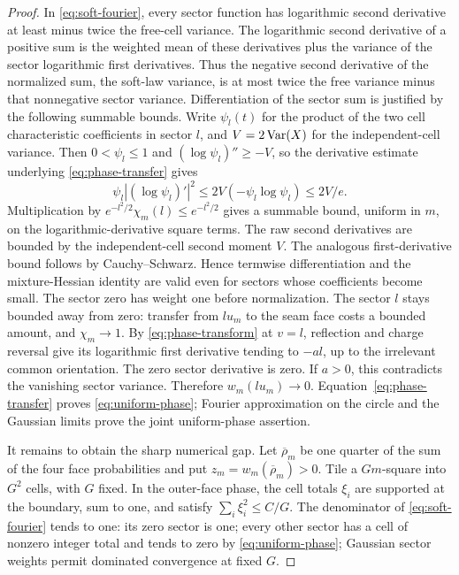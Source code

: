 \begin{proof}
In \eqref{eq:soft-fourier}, every sector function has logarithmic
second derivative at least minus twice the free-cell variance.
The logarithmic second derivative of a positive sum is the
weighted mean of these derivatives plus the variance of the
sector logarithmic first derivatives. Thus the negative second
derivative of the normalized sum, the soft-law variance, is at
most twice the free variance minus that nonnegative sector
variance. Differentiation of the sector sum is justified by
the following summable bounds. Write \(\psi_l(t)\) for the
product of the two cell characteristic coefficients in sector
\(l\), and \(V=2\operatorname{Var}(X)\) for the independent-cell variance.
Then \(0<\psi_l\le1\) and
\((\log\psi_l)''\ge-V\), so the derivative estimate underlying
\eqref{eq:phase-transfer} gives
\[
 \psi_l|(\log\psi_l)'|^2
       \le 2V(-\psi_l\log\psi_l)\le 2V/e.
\]
Multiplication by \(e^{-l^2/2}\chi_m(l)\le e^{-l^2/2}\)
gives a summable bound, uniform in \(m\), on the
logarithmic-derivative square terms. The raw second derivatives
are bounded by the independent-cell second moment \(V\).
The analogous first-derivative bound follows by
Cauchy--Schwarz. Hence termwise differentiation and the
mixture-Hessian identity are valid even for sectors whose
coefficients become small.
The sector zero has weight one before normalization. The sector
\(l\) stays bounded away from zero: transfer from \(lu_m\) to
the seam face costs a bounded amount, and \(\chi_m\to1\).
By \eqref{eq:phase-transform} at \(v=l\), reflection and charge
reversal give its logarithmic first derivative tending to
\(-al\), up to the irrelevant common orientation. The zero
sector derivative is zero. If \(a>0\), this contradicts the
vanishing sector variance. Therefore \(w_m(lu_m)\to0\).
Equation~\eqref{eq:phase-transfer} proves
\eqref{eq:uniform-phase}; Fourier approximation on the circle
and the Gaussian limits prove the joint uniform-phase assertion.

It remains to obtain the sharp numerical gap.
Let \(\overline\rho_m\) be one quarter of the sum of the four
face probabilities and put \(z_m=w_m(\overline\rho_m)>0\).
Tile a \(Gm\)-square into \(G^2\) cells, with \(G\) fixed.
In the outer-face phase, the cell totals \(\xi_i\) are supported
at the boundary, sum to one, and satisfy
\(\sum_i\xi_i^2\le C/G\).
The denominator of \eqref{eq:soft-fourier} tends to one:
its zero sector is one; every other sector has a cell of
nonzero integer total and tends to zero by
\eqref{eq:uniform-phase}; Gaussian sector weights permit
dominated convergence at fixed \(G\).


\end{proof}
